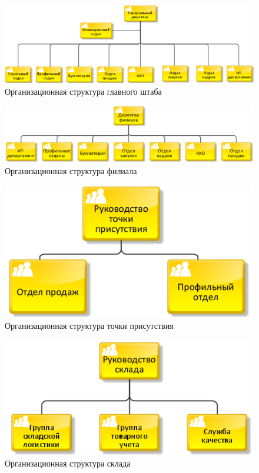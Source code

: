 \documentclass[14pt, a4paper]{extarticle}
\numberwithin{equation}{section}
\begin{document}
\begin{figure}[H]
        \centering
        \includegraphics[scale=0.6]{ARIS_mainDepStructure.png}
        \caption{Организационная структура главного штаба}
        \label{fig:mainDepartamentStructure}
\end{figure}

\begin{figure}[H]
        \centering
        \includegraphics[scale=0.6]{ARIS_filialStructure.png}
        \caption{Организационная структура филиала}
        \label{fig:filialStructure}
\end{figure}

\begin{figure}[H]
        \centering
        \includegraphics[scale=0.6]{ARIS_tpStructure.png}
        \caption{Организационная структура точки присутствия}
        \label{fig:tpStructure}
\end{figure}

\begin{figure}[H]
        \centering
        \includegraphics[scale=0.6]{ARIS_warehouseStructure.png}
        \caption{Организационная структура склада}
        \label{fig:warehouseStructure}
\end{figure}
\end{document}
